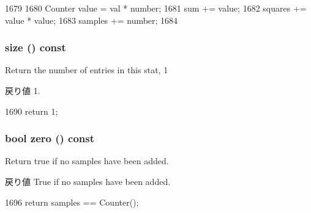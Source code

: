 \begin{DoxyCode}
1679     {
1680         Counter value = val * number;
1681         sum += value;
1682         squares += value * value;
1683         samples += number;
1684     }
\end{DoxyCode}
\hypertarget{classStats_1_1SampleStor_a503ab01f6c0142145d3434f6924714e7}{
\subsubsection[{size}]{ size () const}}
\label{classStats_1_1SampleStor_a503ab01f6c0142145d3434f6924714e7}
Return the number of entries in this stat, 1 \begin{DoxyReturn}{戻り値}
1. 
\end{DoxyReturn}



\begin{DoxyCode}
1690 { return 1; }
\end{DoxyCode}
\hypertarget{classStats_1_1SampleStor_a4e72b01b727d3165e75cba84eb507491}{
\subsubsection[{zero}]{\setlength{\rightskip}{0pt plus 5cm}bool zero () const}}
\label{classStats_1_1SampleStor_a4e72b01b727d3165e75cba84eb507491}
Return true if no samples have been added. \begin{DoxyReturn}{戻り値}
True if no samples have been added. 
\end{DoxyReturn}



\begin{DoxyCode}
1696 { return samples == Counter(); }
\end{DoxyCode}


